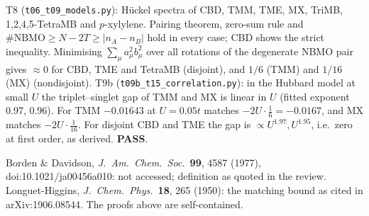 \begin{verifybox}
T8 (\texttt{t06\_t09\_models.py}): Hückel spectra of CBD, TMM, TME, MX, TriMB, 1,2,4,5-TetraMB and
$p$-xylylene. Pairing theorem, zero-sum rule and $\#\text{NBMO}\ge N-2T\ge|n_A-n_B|$ hold in every case;
CBD shows the strict inequality. Minimising $\sum_\mu a_\mu^2b_\mu^2$ over all rotations of the degenerate
NBMO pair gives $\approx0$ for CBD, TME and TetraMB (disjoint), and $1/6$ (TMM) and $1/16$ (MX) (nondisjoint).
T9b (\texttt{t09b\_t15\_correlation.py}): in the Hubbard model at small $U$ the triplet--singlet gap of TMM
and MX is linear in $U$ (fitted exponent 0.97, 0.96). For TMM $-0.01643$ at $U=0.05t$ matches
$-2U\cdot\tfrac16=-0.0167$, and MX matches $-2U\cdot\tfrac1{16}$. For disjoint CBD and TME the gap is
$\propto U^{1.97},U^{1.95}$, i.e.\ zero at first order, as derived. \textbf{PASS}.
\end{verifybox}
\begin{sourcebox}
Borden \& Davidson, \emph{J.\ Am.\ Chem.\ Soc.}\ \textbf{99}, 4587 (1977), doi:10.1021/ja00456a010: not accessed;
definition as quoted in the review. Longuet-Higgins, \emph{J.\ Chem.\ Phys.}\ \textbf{18}, 265 (1950): the matching
bound as cited in arXiv:1906.08544. The proofs above are self-contained.
\end{sourcebox}
